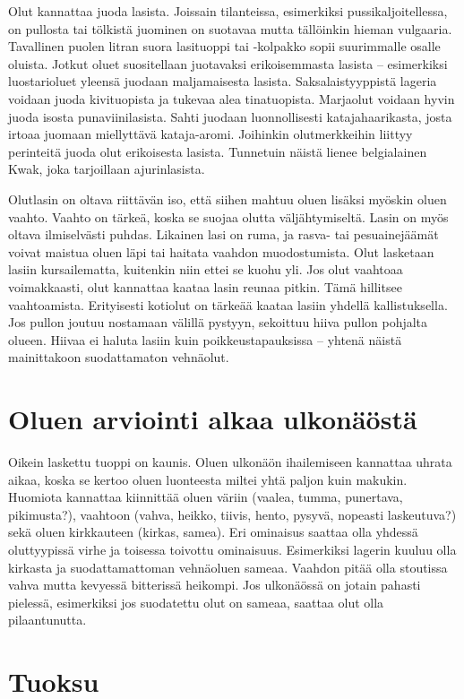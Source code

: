 \documentclass[a4paper,11pt]{report}
\begin{document}
Olut kannattaa juoda lasista. Joissain tilanteissa, esimerkiksi pussikaljoitellessa, on pullosta tai tölkistä juominen on suotavaa mutta tällöinkin hieman vulgaaria. Tavallinen puolen litran suora lasituoppi tai -kolpakko sopii suurimmalle osalle oluista. Jotkut oluet suositellaan juotavaksi erikoisemmasta lasista -- esimerkiksi luostarioluet yleensä juodaan maljamaisesta lasista. Saksalaistyyppistä lageria voidaan juoda kivituopista ja tukevaa alea tinatuopista. Marjaolut voidaan hyvin juoda isosta punaviinilasista. Sahti juodaan luonnollisesti katajahaarikasta, josta irtoaa juomaan miellyttävä kataja-aromi. Joihinkin olutmerkkeihin liittyy perinteitä juoda olut erikoisesta lasista. Tunnetuin näistä lienee belgialainen Kwak, joka tarjoillaan ajurinlasista.

Olutlasin on oltava riittävän iso, että siihen mahtuu oluen lisäksi myöskin oluen vaahto. Vaahto on tärkeä, koska se suojaa olutta väljähtymiseltä. Lasin on myös oltava ilmiselvästi puhdas. Likainen lasi on ruma, ja rasva- tai pesuainejäämät voivat maistua oluen läpi tai haitata vaahdon muodostumista. Olut lasketaan lasiin kursailematta, kuitenkin niin ettei se kuohu yli. Jos olut vaahtoaa voimakkaasti, olut kannattaa kaataa lasin reunaa pitkin. Tämä hillitsee vaahtoamista. Erityisesti kotiolut on tärkeää kaataa lasiin yhdellä kallistuksella. Jos pullon joutuu nostamaan välillä pystyyn, sekoittuu hiiva pullon pohjalta olueen. Hiivaa ei haluta lasiin kuin poikkeustapauksissa -- yhtenä näistä mainittakoon suodattamaton vehnäolut.

\section{Oluen arviointi alkaa ulkonäöstä}

Oikein laskettu tuoppi on kaunis. Oluen ulkonäön ihailemiseen kannattaa uhrata aikaa, koska se kertoo oluen luonteesta miltei yhtä paljon kuin makukin. Huomiota kannattaa kiinnittää oluen väriin (vaalea, tumma, punertava, pikimusta?), vaahtoon (vahva, heikko, tiivis, hento, pysyvä, nopeasti laskeutuva?) sekä oluen kirkkauteen (kirkas, samea). Eri ominaisus saattaa olla yhdessä oluttyypissä virhe ja toisessa toivottu ominaisuus. Esimerkiksi lagerin kuuluu olla kirkasta ja suodattamattoman vehnäoluen sameaa. Vaahdon pitää olla stoutissa vahva mutta kevyessä bitterissä heikompi. Jos ulkonäössä on jotain pahasti pielessä, esimerkiksi jos suodatettu olut on sameaa, saattaa olut olla pilaantunutta.

\section{Tuoksu}
\end{document}
